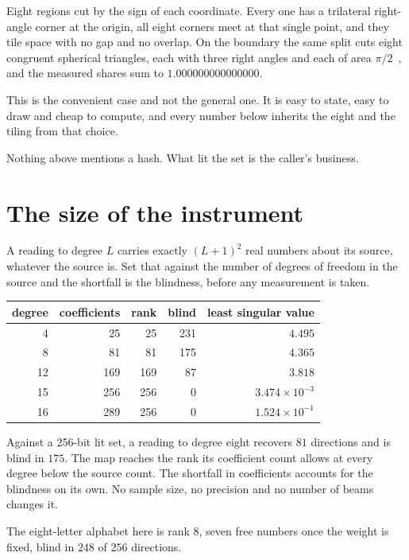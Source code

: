 Eight regions cut by the sign of each coordinate. Every one has a trilateral right-angle corner at the origin, all eight corners meet at that single point, and they tile space with no gap and no overlap. On the boundary the same split cuts eight congruent spherical triangles, each with three right angles and each of area \(\pi/2\)~\cite{src:Girard-1629}, and the measured shares sum to \(1.000000000000000\).

This is the convenient case and not the general one. It is easy to state, easy to draw and cheap to compute, and every number below inherits the eight and the tiling from that choice.

Nothing above mentions a hash. What lit the set is the caller's business.

\section{The size of the instrument}

A reading to degree \(L\) carries exactly \((L+1)^2\) real numbers about its source, whatever the source is. Set that against the number of degrees of freedom in the source and the shortfall is the blindness, before any measurement is taken.

\begin{center}
\begin{tabular}{@{}rrrrr@{}}
\toprule
degree & coefficients & rank & blind & least singular value \\
\midrule
4 & 25 & 25 & 231 & \(4.495\) \\
8 & 81 & 81 & 175 & \(4.365\) \\
12 & 169 & 169 & 87 & \(3.818\) \\
15 & 256 & 256 & 0 & \(3.474 \times 10^{-3}\) \\
16 & 289 & 256 & 0 & \(1.524 \times 10^{-1}\) \\
\bottomrule
\end{tabular}
\end{center}

Against a 256-bit lit set, a reading to degree eight recovers \(81\) directions and is blind in \(175\). The map reaches the rank its coefficient count allows at every degree below the source count. The shortfall in coefficients accounts for the blindness on its own. No sample size, no precision and no number of beams changes it.

The eight-letter alphabet here is rank \(8\), seven free numbers once the weight is fixed, blind in \(248\) of \(256\) directions.

